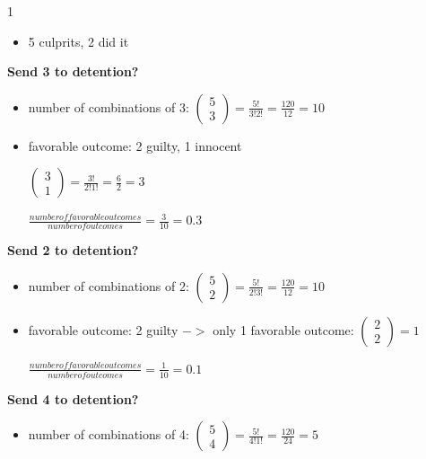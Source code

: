 \documentclass[12 pt]{article}
\begin{document}
    \begin{exercise}{1}
    \hfill

    \begin{itemize}
        \item 5 culprits, 2 did it
    \end{itemize}

    \textbf{Send 3 to detention?}
    \begin{itemize}
        \item number of combinations of 3: $\begin{pmatrix}
            5 \\
            3
        \end{pmatrix} = \frac{5!}{3!2!} = \frac{120}{12} = 10$

        \item favorable outcome: 2 guilty, 1 innocent
        
        $\begin{pmatrix}
            3 \\
            1
        \end{pmatrix} = \frac{3!}{2!1!} = \frac{6}{2} = 3$

        $\frac{number of favorable outcomes}{number of outcomes} = \frac{3}{10} = 0.3$
    \end{itemize}

    \textbf{Send 2 to detention?}
    \begin{itemize}
        \item number of combinations of 2: $\begin{pmatrix}
            5 \\
            2
        \end{pmatrix} = \frac{5!}{2!3!} = \frac{120}{12} = 10$

        \item favorable outcome: 2 guilty $->$ only 1 favorable outcome: $\begin{pmatrix}
            2 \\
            2
        \end{pmatrix} = 1$

        $\frac{number of favorable outcomes}{number of outcomes} = \frac{1}{10} = 0.1$
    \end{itemize}

    \textbf{Send 4 to detention?}
    \begin{itemize}
        \item number of combinations of 4: $\begin{pmatrix}
            5 \\
            4
        \end{pmatrix} = \frac{5!}{4!1!} = \frac{120}{24} = 5$


\end{itemize}
\end{exercise}
\end{document}
